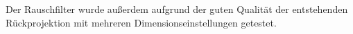 \documentclass[slug=PET, room=Andreas-Schubert-Bau\,\ 424A, supervisor=Carsten\ Bittrich, coursedate=10.\ 01.\ 2020]{../../Lab_Report_LaTeX/lab_report}
\begin{document}

Der Rauschfilter wurde außerdem aufgrund der guten Qualit\"at der
entstehenden R\"uckprojektion mit mehreren Dimensionseinstellungen getestet.
\end{document}

